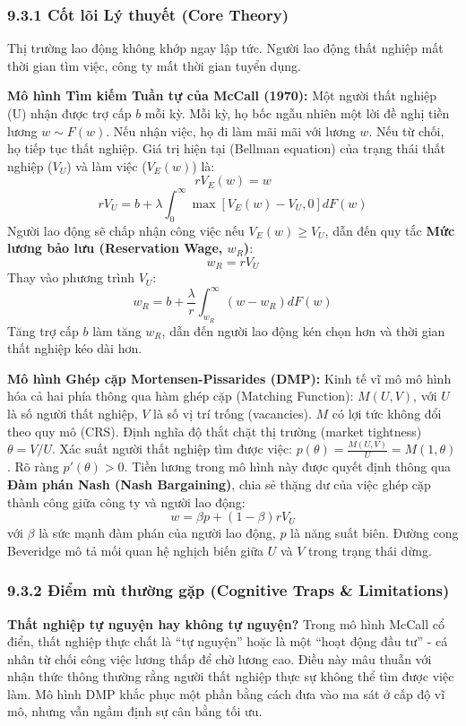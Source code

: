 \documentclass[
]{article}
\begin{document}
\subsubsection{9.3.1 Cốt lõi Lý thuyết (Core
Theory)}\label{cux1ed1t-luxf5i-luxfd-thuyux1ebft-core-theory-34}

Thị trường lao động không khớp ngay lập tức. Người lao động thất nghiệp
mất thời gian tìm việc, công ty mất thời gian tuyển dụng.

\textbf{Mô hình Tìm kiếm Tuần tự của McCall (1970):} Một người thất
nghiệp (U) nhận được trợ cấp \(b\) mỗi kỳ. Mỗi kỳ, họ bốc ngẫu nhiên một
lời đề nghị tiền lương \(w \sim F(w)\). Nếu nhận việc, họ đi làm mãi mãi
với lương \(w\). Nếu từ chối, họ tiếp tục thất nghiệp. Giá trị hiện tại
(Bellman equation) của trạng thái thất nghiệp (\(V_U\)) và làm việc
(\(V_E(w)\)) là: \[ rV_E(w) = w \]
\[ rV_U = b + \lambda \int_0^\infty \max[V_E(w) - V_U, 0] dF(w) \] Người
lao động sẽ chấp nhận công việc nếu \(V_E(w) \geq V_U\), dẫn đến quy tắc
\textbf{Mức lương bảo lưu (Reservation Wage, \(w_R\))}: \[ w_R = rV_U \]
Thay vào phương trình \(V_U\):
\[ w_R = b + \frac{\lambda}{r} \int_{w_R}^\infty (w - w_R) dF(w) \] Tăng
trợ cấp \(b\) làm tăng \(w_R\), dẫn đến người lao động kén chọn hơn và
thời gian thất nghiệp kéo dài hơn.

\textbf{Mô hình Ghép cặp Mortensen-Pissarides (DMP):} Kinh tế vĩ mô mô
hình hóa cả hai phía thông qua hàm ghép cặp (Matching Function):
\(M(U, V)\), với \(U\) là số người thất nghiệp, \(V\) là số vị trí trống
(vacancies). \(M\) có lợi tức không đổi theo quy mô (CRS). Định nghĩa độ
thắt chặt thị trường (market tightness) \(\theta = V / U\). Xác suất
người thất nghiệp tìm được việc:
\(p(\theta) = \frac{M(U, V)}{U} = M(1, \theta)\). Rõ ràng
\(p'(\theta) > 0\). Tiền lương trong mô hình này được quyết định thông
qua \textbf{Đàm phán Nash (Nash Bargaining)}, chia sẻ thặng dư của việc
ghép cặp thành công giữa công ty và người lao động:
\[ w = \beta p + (1-\beta) rV_U \] với \(\beta\) là sức mạnh đàm phán
của người lao động, \(p\) là năng suất biên. Đường cong Beveridge mô tả
mối quan hệ nghịch biến giữa \(U\) và \(V\) trong trạng thái dừng.

\subsubsection{9.3.2 Điểm mù thường gặp (Cognitive Traps \&
Limitations)}\label{ux111iux1ec3m-muxf9-thux1b0ux1eddng-gux1eb7p-cognitive-traps-limitations-71}

\textbf{Thất nghiệp tự nguyện hay không tự nguyện?} Trong mô hình McCall
cổ điển, thất nghiệp thực chất là ``tự nguyện'' hoặc là một ``hoạt động
đầu tư'' - cá nhân từ chối công việc lương thấp để chờ lương cao. Điều
này mâu thuẫn với nhận thức thông thường rằng người thất nghiệp thực sự
không thể tìm được việc làm. Mô hình DMP khắc phục một phần bằng cách
đưa vào ma sát ở cấp độ vĩ mô, nhưng vẫn ngầm định sự cân bằng tối ưu.
\end{document}
